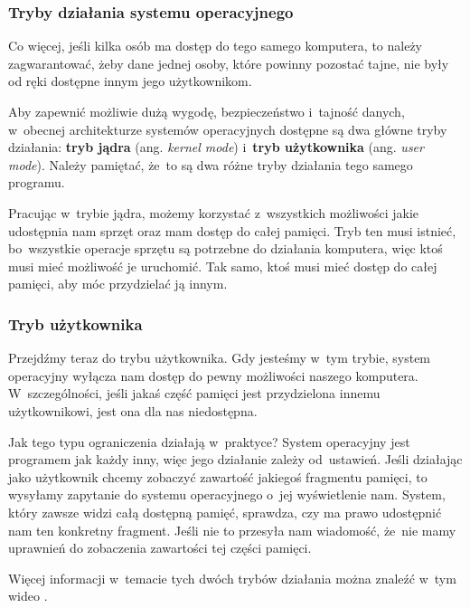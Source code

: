 \documentclass[10pt,t]{beamer}
\begin{document}
\begin{frame}
  \frametitle{Tryby działania systemu operacyjnego}


  Co więcej, jeśli kilka osób ma dostęp do tego samego komputera, to
  należy zagwarantować, żeby dane jednej osoby, które powinny pozostać
  tajne, nie były od ręki dostępne innym jego użytkownikom.

  Aby zapewnić możliwie dużą wygodę, bezpieczeństwo i~tajność danych,
  w~obecnej architekturze systemów operacyjnych dostępne są dwa główne tryby
  działania: \textbf{tryb jądra} (ang. \textit{kernel mode})
  i~\textbf{tryb użytkownika} (ang. \textit{user mode}). Należy pamiętać,
  że~to są dwa różne tryby działania tego samego programu.

  Pracując w~trybie jądra, możemy korzystać z~wszystkich możliwości jakie
  udostępnia nam sprzęt oraz mam dostęp do całej pamięci. Tryb ten musi
  istnieć, bo~wszystkie operacje sprzętu są potrzebne do działania
  komputera, więc
  ktoś musi mieć możliwość je uruchomić. Tak samo, ktoś musi mieć dostęp do
  całej pamięci, aby móc przydzielać ją innym.

\end{frame}





\begin{frame}
  \frametitle{Tryb użytkownika}


  Przejdźmy teraz do trybu użytkownika. Gdy jesteśmy w~tym trybie, system
  operacyjny wyłącza nam dostęp do pewny możliwości naszego komputera.
  W~szczególności, jeśli jakaś część pamięci jest przydzielona innemu
  użytkownikowi, jest ona dla nas niedostępna.

  Jak tego typu ograniczenia działają w~praktyce? System operacyjny jest
  programem jak każdy inny, więc jego działanie zależy od~ustawień. Jeśli
  działając jako użytkownik chcemy zobaczyć zawartość jakiegoś fragmentu
  pamięci, to wysyłamy zapytanie do systemu operacyjnego o~jej wyświetlenie
  nam. System, który zawsze widzi całą dostępną pamięć, sprawdza, czy ma
  prawo udostępnić nam ten konkretny fragment. Jeśli nie to przesyła nam
  wiadomość, że~nie mamy uprawnień do zobaczenia zawartości tej części
  pamięci.

  Więcej informacji w~temacie tych dwóch trybów działania można znaleźć
  w~tym wideo
  \parencite{Daves-Garage-Kernel-Mode-vs-User-Mode-Why-it-ETC-Ver-2024}.

\end{frame}
\end{document}
